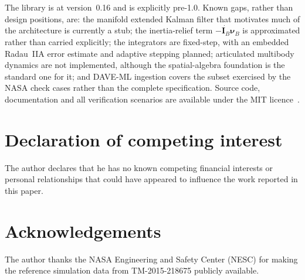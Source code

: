 \documentclass[preprint,12pt,a4paper]{elsarticle}
\newcommand{\nuB}{\boldsymbol{\nu}_B}
\newcommand{\IB}{\mathbf{I}_B}
\begin{document}
The library is at version~0.16 and is explicitly pre-1.0. Known gaps, rather
than design positions, are: the manifold extended Kalman filter that motivates
much of the architecture is currently a stub; the inertia-relief term
$-\dot{\IB}\nuB$ is approximated rather than carried explicitly; the
integrators are fixed-step, with an embedded Radau~IIA error estimate and
adaptive stepping planned; articulated multibody dynamics are not implemented,
although the spatial-algebra foundation is the standard one for it; and DAVE-ML
ingestion covers the subset exercised by the NASA check cases rather than the
complete specification. Source code, documentation and all verification
scenarios are available under the MIT licence~\cite{aetherion_2025}.

\section*{Declaration of competing interest}

The author declares that he has no known competing financial interests or
personal relationships that could have appeared to influence the work reported
in this paper.

\section*{Acknowledgements}

The author thanks the NASA Engineering and Safety Center (NESC) for making the
reference simulation data from TM-2015-218675 publicly available.



\end{document}

